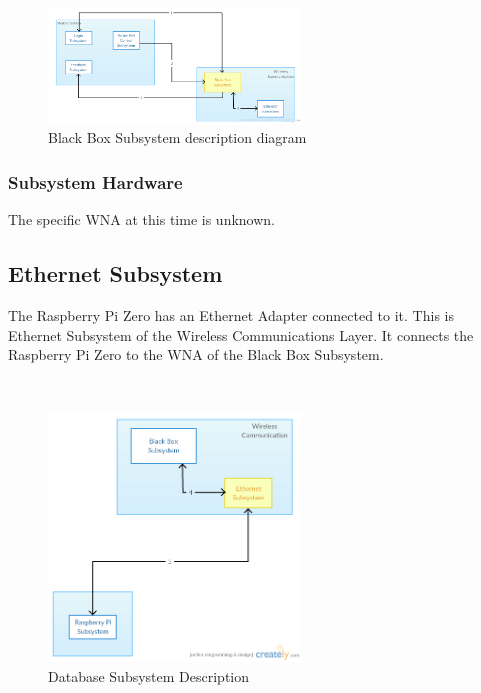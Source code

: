 \begin{figure}[h!]
	\centering
 	\includegraphics[width=0.60\textwidth]{architectural design specification latex/images/ADSdiagrams/blackboxsubsystem.png}
 \caption{Black Box Subsystem description diagram}
\end{figure}

\subsubsection{Subsystem Hardware}
The specific WNA at this time is unknown.

\subsection{Ethernet Subsystem}
The Raspberry Pi Zero has an Ethernet Adapter connected to it. This is Ethernet Subsystem of the Wireless Communications Layer. It connects the Raspberry Pi Zero to the WNA of the Black Box Subsystem.

\begin{figure}[h!] 
 	\centering 
  	\includegraphics[width=0.60\textwidth]{architectural design specification latex/images/ADSdiagrams/ethernetsubsystem.png} 
 \caption{Database Subsystem Description} 
\end{figure}
